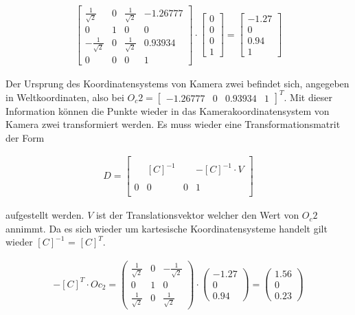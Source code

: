 \begin{gather}
\begin{bmatrix}
	\frac{1}{\sqrt{2}}&0&\frac{1}{\sqrt{2}}&-1.26777\\
	0&1&0&0\\
	-\frac{1}{\sqrt{2}}&0&\frac{1}{\sqrt{2}}&0.93934\\
	0&0&0&1
	\end{bmatrix} \cdot 
	\begin{bmatrix}
	0\\0\\0\\1
	\end{bmatrix}
	=
	\begin{bmatrix}
	-1.27\\0\\0.94\\1
	\end{bmatrix}	
\end{gather} 

Der Ursprung des Koordinatensystems von Kamera zwei befindet sich, angegeben in Weltkoordinaten, also bei $O_c2 =	\begin{bmatrix}-1.26777&0&0.93934&1\end{bmatrix}^T$. Mit dieser Information können die Punkte wieder in das Kamerakoordinatensystem von Kamera zwei transformiert werden. Es muss wieder eine Transformationsmatrit der Form 

\begin{gather}
	D = 	\begin{bmatrix}
	&&&\\
	&[C]^{-1}&& -[C]^{-1} \cdot V\\
	&&&\\
	0&0&0&1\\
	\end{bmatrix}
\end{gather}

aufgestellt werden. $V$ ist der Translationsvektor welcher den Wert von $O_c2$ annimmt. Da es sich wieder um kartesische Koordinatensysteme handelt gilt wieder $[C]^{-1}$ = $[C]^{T}$.

\begin{gather}
	 -[C]^{T}\cdot Oc_2 = 
	 \begin{pmatrix}
	 \frac{1}{\sqrt{2}}&0&-\frac{1}{\sqrt{2}}\\
	 0&1&0\\
	 \frac{1}{\sqrt{2}}&0&\frac{1}{\sqrt{2}}
	 \end{pmatrix}
	 \cdot
	 \begin{pmatrix}
	 -1.27\\0\\0.94
	 \end{pmatrix}
	 =
	  \begin{pmatrix}
	 1.56\\0\\0.23
	 \end{pmatrix}
\end{gather}


